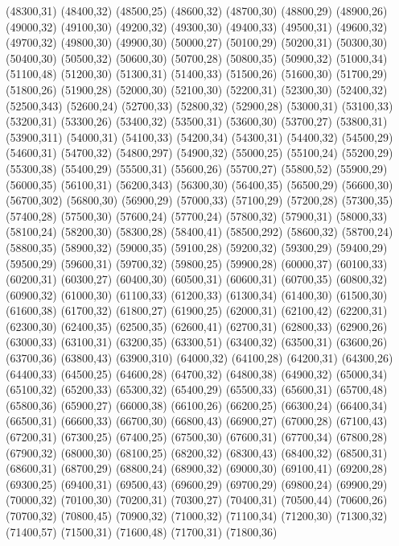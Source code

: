 (48300,31)
(48400,32)
(48500,25)
(48600,32)
(48700,30)
(48800,29)
(48900,26)
(49000,32)
(49100,30)
(49200,32)
(49300,30)
(49400,33)
(49500,31)
(49600,32)
(49700,32)
(49800,30)
(49900,30)
(50000,27)
(50100,29)
(50200,31)
(50300,30)
(50400,30)
(50500,32)
(50600,30)
(50700,28)
(50800,35)
(50900,32)
(51000,34)
(51100,48)
(51200,30)
(51300,31)
(51400,33)
(51500,26)
(51600,30)
(51700,29)
(51800,26)
(51900,28)
(52000,30)
(52100,30)
(52200,31)
(52300,30)
(52400,32)
(52500,343)
(52600,24)
(52700,33)
(52800,32)
(52900,28)
(53000,31)
(53100,33)
(53200,31)
(53300,26)
(53400,32)
(53500,31)
(53600,30)
(53700,27)
(53800,31)
(53900,311)
(54000,31)
(54100,33)
(54200,34)
(54300,31)
(54400,32)
(54500,29)
(54600,31)
(54700,32)
(54800,297)
(54900,32)
(55000,25)
(55100,24)
(55200,29)
(55300,38)
(55400,29)
(55500,31)
(55600,26)
(55700,27)
(55800,52)
(55900,29)
(56000,35)
(56100,31)
(56200,343)
(56300,30)
(56400,35)
(56500,29)
(56600,30)
(56700,302)
(56800,30)
(56900,29)
(57000,33)
(57100,29)
(57200,28)
(57300,35)
(57400,28)
(57500,30)
(57600,24)
(57700,24)
(57800,32)
(57900,31)
(58000,33)
(58100,24)
(58200,30)
(58300,28)
(58400,41)
(58500,292)
(58600,32)
(58700,24)
(58800,35)
(58900,32)
(59000,35)
(59100,28)
(59200,32)
(59300,29)
(59400,29)
(59500,29)
(59600,31)
(59700,32)
(59800,25)
(59900,28)
(60000,37)
(60100,33)
(60200,31)
(60300,27)
(60400,30)
(60500,31)
(60600,31)
(60700,35)
(60800,32)
(60900,32)
(61000,30)
(61100,33)
(61200,33)
(61300,34)
(61400,30)
(61500,30)
(61600,38)
(61700,32)
(61800,27)
(61900,25)
(62000,31)
(62100,42)
(62200,31)
(62300,30)
(62400,35)
(62500,35)
(62600,41)
(62700,31)
(62800,33)
(62900,26)
(63000,33)
(63100,31)
(63200,35)
(63300,51)
(63400,32)
(63500,31)
(63600,26)
(63700,36)
(63800,43)
(63900,310)
(64000,32)
(64100,28)
(64200,31)
(64300,26)
(64400,33)
(64500,25)
(64600,28)
(64700,32)
(64800,38)
(64900,32)
(65000,34)
(65100,32)
(65200,33)
(65300,32)
(65400,29)
(65500,33)
(65600,31)
(65700,48)
(65800,36)
(65900,27)
(66000,38)
(66100,26)
(66200,25)
(66300,24)
(66400,34)
(66500,31)
(66600,33)
(66700,30)
(66800,43)
(66900,27)
(67000,28)
(67100,43)
(67200,31)
(67300,25)
(67400,25)
(67500,30)
(67600,31)
(67700,34)
(67800,28)
(67900,32)
(68000,30)
(68100,25)
(68200,32)
(68300,43)
(68400,32)
(68500,31)
(68600,31)
(68700,29)
(68800,24)
(68900,32)
(69000,30)
(69100,41)
(69200,28)
(69300,25)
(69400,31)
(69500,43)
(69600,29)
(69700,29)
(69800,24)
(69900,29)
(70000,32)
(70100,30)
(70200,31)
(70300,27)
(70400,31)
(70500,44)
(70600,26)
(70700,32)
(70800,45)
(70900,32)
(71000,32)
(71100,34)
(71200,30)
(71300,32)
(71400,57)
(71500,31)
(71600,48)
(71700,31)
(71800,36)
